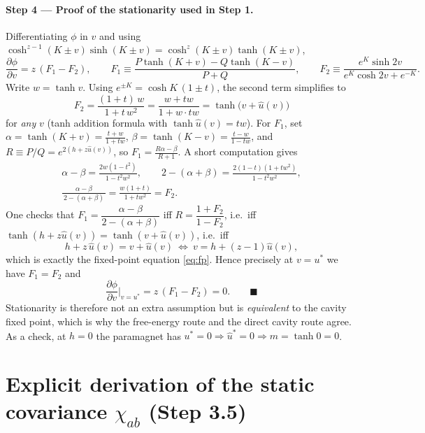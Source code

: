\documentclass[11pt]{article}
\begin{document}
\paragraph{Step 4 --- Proof of the stationarity used in Step 1.}
Differentiating $\phi$ in $v$ and using $\cosh^{z-1}(K{\pm}v)\sinh(K{\pm}v)=\cosh^z(K{\pm}v)\tanh(K{\pm}v)$,
\begin{equation*}
\frac{\partial\phi}{\partial v}=z\,(F_1-F_2),\qquad
F_1\equiv\frac{P\tanh(K{+}v)-Q\tanh(K{-}v)}{P+Q},\qquad
F_2\equiv\frac{e^{K}\sinh2v}{e^{K}\cosh2v+e^{-K}} .
\end{equation*}
Write $w=\tanh v$. Using $e^{\pm K}=\cosh K\,(1\pm t)$, the second term simplifies to
\begin{equation*}
F_2=\frac{(1+t)\,w}{1+t\,w^{2}}=\frac{w+tw}{1+w\cdot tw}=\tanh\!\big(v+\hat u(v)\big)
\end{equation*}
for \emph{any} $v$ (tanh addition formula with $\tanh\hat u(v)=tw$). For $F_1$, set
$\alpha=\tanh(K{+}v)=\frac{t+w}{1+tw}$, $\beta=\tanh(K{-}v)=\frac{t-w}{1-tw}$, and
$R\equiv P/Q=e^{2(h+z\hat u(v))}$, so $F_1=\frac{R\alpha-\beta}{R+1}$. A short computation gives
\begin{gather*}
\alpha-\beta=\frac{2w(1-t^2)}{1-t^2w^2},\qquad
2-(\alpha+\beta)=\frac{2(1-t)(1+tw^2)}{1-t^2w^2},\\[3pt]
\frac{\alpha-\beta}{\,2-(\alpha+\beta)\,}=\frac{w(1+t)}{1+tw^2}=F_2 .
\end{gather*}
One checks that $F_1=\dfrac{\alpha-\beta}{2-(\alpha+\beta)}$ iff $R=\dfrac{1+F_2}{1-F_2}$, i.e.\ iff
$\tanh(h+z\hat u(v))=\tanh(v+\hat u(v))$, i.e.\ iff
\begin{equation*}
h+z\,\hat u(v)=v+\hat u(v)\ \Longleftrightarrow\ v=h+(z-1)\hat u(v),
\end{equation*}
which is exactly the fixed-point equation \eqref{eq:fp}. Hence precisely at $v=u^*$ we have $F_1=F_2$ and
\begin{equation*}
\frac{\partial\phi}{\partial v}\Big|_{v=u^*}=z\,(F_1-F_2)=0 . \qquad\blacksquare
\end{equation*}
Stationarity is therefore not an extra assumption but is \emph{equivalent} to the cavity fixed point,
which is why the free-energy route and the direct cavity route agree. As a check, at $h=0$ the
paramagnet has $u^*=0\Rightarrow\hat u^*=0\Rightarrow m=\tanh0=0$.

\section{Explicit derivation of the static covariance \texorpdfstring{$\chi_{ab}$}{chi\_ab} (Step 3.5)}
\label{app:chi}
\end{document}
